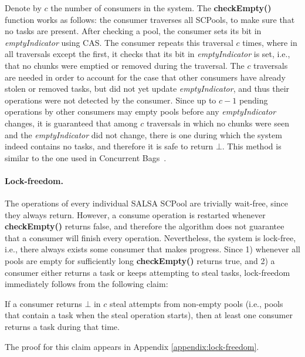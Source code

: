 Denote by $c$ the number of consumers in the system. The {\bf checkEmpty()} function works as follows: the consumer traverses all SCPools, to make sure that no tasks are present. After checking a pool, the consumer sets its bit in \emph{emptyIndicator} using CAS. The consumer repeats this traversal $c$ times, where in all traversals except the first, it checks that its bit in \emph{emptyIndicator} is set, i.e., that no chunks were emptied or removed during the traversal. The $c$ traversals are needed in order to account for the case that other consumers have already stolen or removed tasks, but did not yet update \emph{emptyIndicator}, and thus their operations were not detected by the consumer. Since up to $c-1$ pending operations by other consumers may empty pools before any \emph{emptyIndicator} changes, it is guaranteed that among $c$ traversals in which no chunks were seen and the \emph{emptyIndicator} did not change, there is one during which the system indeed contains no tasks, and therefore it is safe to return $\bot$. This method is similar to the one used in Concurrent Bags~\cite{Sundell:2011:LAC:1989493.1989550}.
\paragraph{Lock-freedom.}
The operations of every individual SALSA SCPool are trivially wait-free, since they always return. However, a consume operation is restarted whenever {\bf checkEmpty()} returns false, and therefore the algorithm does not guarantee that a consumer will finish every operation. Nevertheless, the system is lock-free, i.e., there always exists some consumer that makes progress. Since 1) whenever all pools are empty for sufficiently long {\bf checkEmpty()} returns true, and 2) a consumer either returns a task or keeps attempting to steal tasks, lock-freedom immediately follows from the following claim:

\begin{claim}
\label{claim:lock-free}
If a consumer returns $\bot$ in $c$ steal attempts from non-empty pools (i.e., pools that contain a task when the steal operation starts), then at least one consumer returns a task during that time. 
\end{claim}
The proof for this claim appears in Appendix \ref{appendix:lock-freedom}.